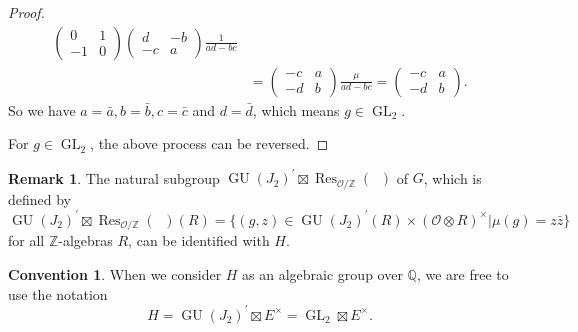 \documentclass[11pt, a4paper]{amsart}
\theoremstyle{plain}
\theoremstyle{definition}
\newtheorem{remark}[theorem]{Remark}
\newtheorem{convention}[theorem]{Convention}
\numberwithin{equation}{section}
\def\QQ{\mathbb{Q}}
\def\ZZ{\mathbb{Z}}
\DeclareMathOperator{\Res}{Res}
\DeclareMathOperator{\GU}{GU}
\DeclareMathOperator{\GL}{\mathrm{GL}}
\DeclareMathOperator{\Gm}{\mathrm{G_{m}}}
\begin{document}
\begin{proof}
\begin{align*}
\begin{pmatrix}
                                                            0 & 1 \\
                                                            -1 & 0 
                                                        \end{pmatrix} \begin{pmatrix}
                                                                        d & -b \\
                                                                        -c & a
                                                                      \end{pmatrix} \frac{1}{ad - bc} \\ 
        & = \begin{pmatrix}
                -c & a \\
                -d & b 
            \end{pmatrix} \frac{\mu}{ad - bc} = \begin{pmatrix}
                                                    -c & a \\
                                                    -d & b 
                                                 \end{pmatrix}. 
    \end{align*}
    So we have $a = \bar{a}, b = \bar{b}, c = \bar{c}$ and $d = \bar{d}$, which means $g \in \GL_2$. 
    \par For $g \in \GL_2$, the above process can be reversed. 
\end{proof}

\begin{remark}
The natural subgroup $\GU(J_2)^{\prime} \boxtimes \Res_{\mathcal{O}/\ZZ}(\Gm)$ of $G$, which is defined by 
\begin{equation*}
    \GU(J_2)^{\prime} \boxtimes \Res_{\mathcal{O}/\ZZ}(\Gm)(R) = \{(g, z) \in \GU(J_2)^{\prime}(R) \times (\mathcal{O} \otimes R)^{\times} | \mu(g) = z \bar{z} \}
\end{equation*}
for all $\ZZ$-algebras $R$, can be identified with $H$. 
\end{remark}

\begin{convention}
    When we consider $H$ as an algebraic group over $\QQ$, we are free to use the notation
    \begin{equation*}
        H = \GU(J_2)^{\prime} \boxtimes E^{\times} = \GL_2 \boxtimes E^{\times}. 
    \end{equation*}
\end{convention}
\end{document}
